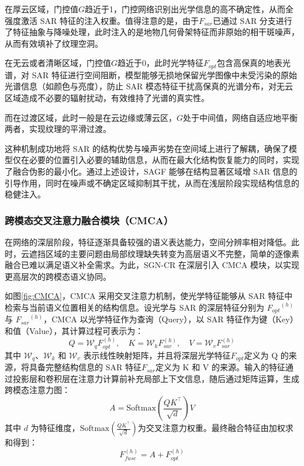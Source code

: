 在厚云区域，门控值$G$趋近于1，门控网络识别出光学信息的高不确定性，从而全强度激活 SAR 特征的注入权重。值得注意的是，由于$F_{sar}$已通过 SAR 分支进行了特征抽象与降噪处理，此时注入的是地物几何骨架特征而非原始的相干斑噪声，从而有效填补了纹理空洞。

在无云或者清晰区域，门控值$G$趋近于0，此时光学特征$F_{opt}$包含高保真的地表光谱，对 SAR 特征进行空间阻断，模型能够无损地保留光学图像中未受污染的原始光谱信息（如颜色与亮度），防止 SAR 模态特征干扰高保真的光谱分布，对无云区域造成不必要的辐射扰动，有效维持了光谱的真实性。

而在过渡区域，此时一般是在云边缘或薄云区，$G$处于中间值，网络自适应地平衡两者，实现纹理的平滑过渡。

这种机制成功地将 SAR 的结构优势与噪声劣势在空间域上进行了解耦，确保了模型仅在必要的位置引入必要的辅助信息，从而在最大化结构恢复能力的同时，实现了融合伪影的最小化。通过上述设计，SAGF 能够在结构显著区域增 SAR 信息的引导作用，同时在噪声或不确定区域抑制其干扰，从而在浅层阶段实现结构信息的稳健注入。
\subsubsection{跨模态交叉注意力融合模块（CMCA）}
在网络的深层阶段，特征逐渐具备较强的语义表达能力，空间分辨率相对降低。此时，云遮挡区域的主要问题由局部纹理缺失转变为高层语义不完整，简单的逐像素融合已难以满足语义补全需求。为此，SGN-CR 在深层引入 CMCA 模块，以实现更高层次的跨模态语义协同。

如图\ref{fig:CMCA}，CMCA 采用交叉注意力机制，使光学特征能够从 SAR 特征中检索与当前语义位置相关的结构信息。设光学与 SAR 的深层特征分别为 ${F_{opt}}^{(h)}$ 与 ${F_{sar}}^{(h)}$，CMCA 以光学特征作为查询（Query），以 SAR 特征作为键（Key）和值（Value），其计算过程可表示为：
\begin{equation}
Q = \mathcal{W}_q F_{opt}^{(h)},\quad
K = \mathcal{W}_k F_{sar}^{(h)}, \quad
V = \mathcal{W}_v F_{sar}^{(h)}
\end{equation}
其中 $\mathcal{W}_q$、$\mathcal{W}_k$ 和 $\mathcal{W}_v$ 表示线性映射矩阵，并且将深层光学特征$F_{opt}$定义为 Q 的来源，将具备完整结构信息的 SAR 特征$F_{sar}$定义为 K 和 V 的来源。输入的特征通过投影层和卷积层在注意力计算前补充局部上下文信息，随后通过矩阵运算，生成跨模态注意力图：
\begin{equation}
A = \mathrm{Softmax}\left( \frac{{QK}^\top}{\sqrt{d}} \right)V
\end{equation}
其中 $d$ 为特征维度，$\mathrm{Softmax}\left( \frac{{QK}^\top}{\sqrt{d}} \right)$为交叉注意力权重。最终融合特征由加权求和得到：
\begin{equation}
F_{fuse}^{(h)} = A + F_{opt}^{(h)}
\end{equation}

